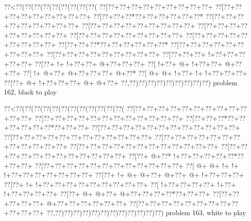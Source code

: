 \vbox{\vbox{\goo
\0??<\0??(\0??(\0??(\0??(\0??(\0??(\0??(\0??(\0??(
\0??[\0??+\0??+\0??+\0??+\0??+\0??+\0??+\0??+\0??+
\0??[\0??+\0??+\0??+\0??+\0??+\0??+\0??+\0??+\0??+
\0??[\0??+\0??+\0??*\0??+\0??+\0??+\0??+\0??+\0??*
\0??[\0??+\0??+\0??+\0??+\0??+\0??+\0??+\0??+\0??+
\0??[\0??+\0??+\0??+\0??+\0??+\0??+\0??+\0??+\0??+
\0??[\0??+\0??+\0??+\0??+\0??+\0??+\0??+\0??+\0??+
\0??[\0??+\0??+\0??+\0??+\0??+\0??+\0??+\0??+\0??+
\0??[\0??+\0??+\0??+\0??+\0??+\0??+\0??+\0??+\0??+
\0??[\0??+\0??+\0??*\0??+\0??+\0??+\0??+\0??+\0??*
\0??[\0??+\0??+\0??+\0??+\0??+\0??+\0??+\0??+\0??+
\0??[\0??+\0??+\0??+\0??+\0??+\0??+\0??+\0??+\0??+
\0??[\0??+\0??+\0??+\- !+\0??+\0??+\0??+\0??+\0??+
\0??[\0??+\- !+\- !+\0??+\0??+\- @+\0??+\0??+\0??+
\0??[\- !+\0??+\- @+\- !+\0??+\0??+\- @+\0??+\0??+
\0??[\- !+\- @+\0??+\- @+\0??+\0??+\0??+\- @+\0??*
\0??[\- @+\- @+\- !+\0??+\- !+\- !+\0??+\0??+\0??+
\0??[\0??+\- @+\- !+\0??+\0??+\0??+\- @+\- @+\0??+
\0??,\0??)\0??)\0??)\0??)\0??)\0??)\0??)\0??)\0??)
}
\hfil problem 162, black to play\hfil\break
}

\vbox{\vbox{\goo
\0??<\0??(\0??(\0??(\0??(\0??(\0??(\0??(\0??(\0??(\0??(\0??(\0??(
\0??[\0??+\0??+\0??+\0??+\0??+\0??+\0??+\0??+\0??+\0??+\0??+\0??+
\0??[\0??+\0??+\0??+\0??+\0??+\0??+\0??+\0??+\0??+\0??+\0??+\0??+
\0??[\0??+\0??+\0??*\0??+\0??+\0??+\0??+\0??+\0??*\0??+\0??+\0??+
\0??[\0??+\0??+\0??+\0??+\0??+\0??+\0??+\0??+\0??+\0??+\0??+\0??+
\0??[\0??+\0??+\0??+\0??+\0??+\0??+\0??+\0??+\0??+\0??+\0??+\0??+
\0??[\0??+\0??+\0??+\0??+\0??+\0??+\0??+\0??+\0??+\0??+\0??+\0??+
\0??[\0??+\0??+\0??+\0??+\0??+\0??+\0??+\0??+\0??+\0??+\0??+\0??+
\0??[\0??+\0??+\0??+\0??+\0??+\0??+\0??+\0??+\0??+\0??+\0??+\0??+
\0??[\0??+\- @+\0??*\- !+\0??+\0??+\0??+\0??+\0??*\0??+\0??+\0??+
\0??[\0??+\0??+\0??+\0??+\0??+\0??+\0??+\0??+\0??+\0??+\0??+\0??+
\0??[\- @+\- @+\- !+\- !+\- !+\0??+\0??+\0??+\0??+\0??+\0??+\0??+
\0??[\0??+\- !+\- @+\- @+\0??+\- @+\0??+\- @+\- !+\0??+\0??+\0??+
\0??[\0??+\- !+\- !+\0??+\0??+\0??+\0??+\0??+\0??+\0??+\0??+\0??+
\0??[\- !+\0??+\0??+\0??+\0??+\- !+\0??+\- !+\0??+\0??+\0??+\0??+
\0??[\0??+\- @+\- @+\0??+\- @+\0??+\0??+\0??+\0??*\0??+\0??+\0??+
\0??[\0??+\0??+\0??+\0??+\0??+\- @+\0??+\0??+\0??+\0??+\0??+\0??+
\0??[\0??+\0??+\0??+\0??+\0??+\0??+\0??+\0??+\0??+\0??+\0??+\0??+
\0??,\0??)\0??)\0??)\0??)\0??)\0??)\0??)\0??)\0??)\0??)\0??)\0??)
}
\hfil problem 163, white to play\hfil\break
}

